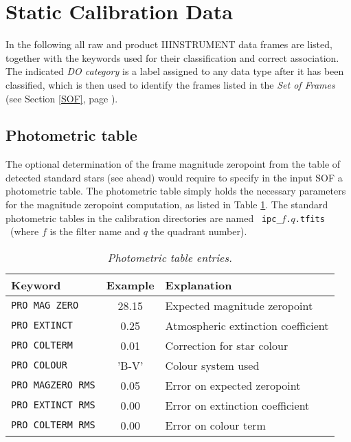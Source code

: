 \section{Static Calibration Data}
\label{CALDATA}

In the following all raw and product IIINSTRUMENT data frames are listed,
together with the keywords used for their classification and 
correct association. The indicated {\it DO category} is a 
label assigned to any data type after it has been classified,
which is then used to identify
the frames listed in the {\it Set of Frames} (see Section
\ref{SOF}, page \pageref{SOF}).

\subsection{Photometric table} 

The optional determination of the frame magnitude 
zeropoint from the table of detected standard stars (see ahead) 
would require to specify in the input SOF a photometric table.
The photometric table simply holds the necessary parameters
for the magnitude zeropoint computation, as listed in Table \ref{PHOTO}.
The standard photometric tables in the calibration directories are
named \ {\tt ipc\_}$f${\tt .}$q${\tt .tfits} \ (where $f$ is the filter
name and $q$ the quadrant number).

\begin{table}[ht]
  \begin{center}
    \begin{tabular}{|l|c|l|}
    \hline
      {\bf Keyword} & {\bf Example} & {\bf Explanation} \\
    \hline
      {\tt PRO MAG ZERO} & 28.15 & Expected magnitude zeropoint  \\
      {\tt PRO EXTINCT}  &  0.25 & Atmospheric extinction coefficient  \\
      {\tt PRO COLTERM}  &  0.01 & Correction for star colour  \\
      {\tt PRO COLOUR}   & 'B-V' & Colour system used  \\
      {\tt PRO MAGZERO RMS} & 0.05 & Error on expected zeropoint  \\
      {\tt PRO EXTINCT RMS} & 0.00 & Error on extinction coefficient  \\
      {\tt PRO COLTERM RMS} & 0.00 & Error on colour term  \\
    \hline
    \end{tabular}
    \caption{\it Photometric table entries.}
    \label{PHOTO}
  \end{center}
\end{table}



